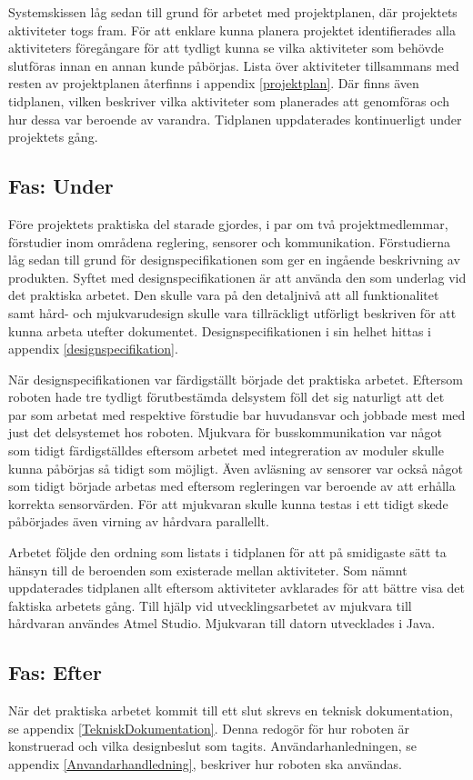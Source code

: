 \documentclass[11pt]{article}
\begin{document}
\begin{flushleft}
Systemskissen låg sedan till grund för arbetet med projektplanen, där projektets aktiviteter togs fram. För att enklare kunna planera projektet identifierades alla aktiviteters föregångare för att tydligt kunna se vilka aktiviteter som behövde slutföras innan en annan kunde påbörjas. Lista över aktiviteter tillsammans med resten av projektplanen återfinns i appendix \ref{projektplan}. Där finns även tidplanen, vilken beskriver vilka aktiviteter som planerades att genomföras och hur dessa var beroende av varandra. Tidplanen uppdaterades kontinuerligt under projektets gång.

\subsection{Fas: Under}
Före projektets praktiska del starade gjordes, i par om två projektmedlemmar, förstudier inom områdena reglering, sensorer och kommunikation. Förstudierna låg sedan till grund för designspecifikationen som ger en ingående beskrivning av produkten. Syftet med designspecifikationen är att använda den som underlag vid det praktiska arbetet. Den skulle vara på den detaljnivå att all funktionalitet samt hård- och mjukvarudesign skulle vara tillräckligt utförligt beskriven för att kunna arbeta utefter dokumentet. Designspecifikationen i sin helhet hittas i appendix \ref{designspecifikation}. 

När designspecifikationen var färdigställt började det praktiska arbetet. Eftersom roboten hade tre tydligt förutbestämda delsystem föll det sig naturligt att det par som arbetat med respektive förstudie bar huvudansvar och jobbade mest med just det delsystemet hos roboten. Mjukvara för busskommunikation var något som tidigt färdigställdes eftersom arbetet med integreration av moduler skulle kunna påbörjas så tidigt som möjligt. Även avläsning av sensorer var också något som tidigt började arbetas med eftersom regleringen var beroende av att erhålla korrekta sensorvärden. För att mjukvaran skulle kunna testas i ett tidigt skede påbörjades även virning av hårdvara parallellt. 

Arbetet följde den ordning som listats i tidplanen för att på smidigaste sätt ta hänsyn till de beroenden som existerade mellan aktiviteter. Som nämnt uppdaterades tidplanen allt eftersom aktiviteter avklarades för att bättre visa det faktiska arbetets gång. Till hjälp vid utvecklingsarbetet av mjukvara till hårdvaran användes Atmel Studio. Mjukvaran till datorn utvecklades i Java. 

\subsection{Fas: Efter}
När det praktiska arbetet kommit till ett slut skrevs en teknisk dokumentation, se appendix \ref{TekniskDokumentation}. Denna redogör för hur roboten är konstruerad och vilka designbeslut som tagits. Användarhanledningen, se appendix \ref{Anvandarhandledning}, beskriver hur roboten ska användas.


\end{flushleft}
\end{document}
